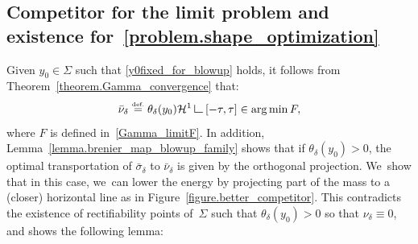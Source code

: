 \documentclass[10pt]{amsart}
\theoremstyle{definition}
\newcommand{\eqdef}{\ensuremath{\stackrel{\mbox{\upshape\tiny def.}}{=}}}
\newcommand\LM[1]{\hbox{\vrule width.5pt \vbox to#1pt{\vfill \hrule width#1pt height.5pt}}}
\newcommand\LL{{\mathchoice {\>\LM7\>}{\>\LM7\>}{\,\LM5\,}{\,\LM{3.35}\,}}}
\newcommand{\mres}{\LL}
\newcommand\cH{\mathcal{H}}
\DeclareMathOperator*{\argmin}{arg\,min}
\begin{document}
\subsection{Competitor for the limit problem and existence for~\eqref{problem.shape_optimization}}

Given $y_0\in \Sigma$ such that \eqref{y0fixed_for_blowup} holds, it follows from Theorem~\ref{theorem.Gamma_convergence} that:
\[
\bar \nu_{\delta} \eqdef \theta_\delta(y_0)\cH^1\mres [-\tau, \tau]
\in
\argmin F,
\]
where $F$ is defined in~\eqref{Gamma_limitF}.
In addition, Lemma~\ref{lemma.brenier_map_blowup_family} shows that if $\theta_\delta(y_0)>0$, the optimal transportation of $\bar \sigma_{\delta}$ to $\bar \nu_{\delta}$ is given by the orthogonal projection. We~show that in this case, we~can lower the energy by projecting part of the mass to a (closer) horizontal line as in Figure~\ref{figure.better_competitor}.
This contradicts the existence of rectifiability points of~$\Sigma$ such that $\theta_\delta(y_0) > 0$ so that $\nu_\delta \equiv 0$, and shows the following lemma:
\end{document}

